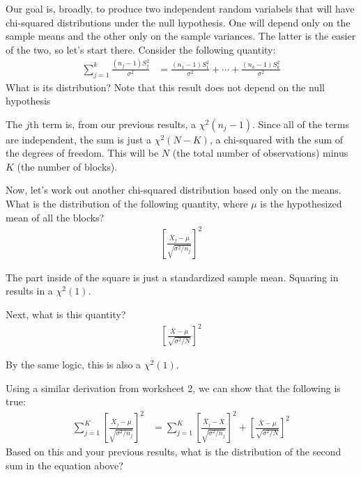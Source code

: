 
Our goal is, broadly, to produce two independent random variabels that will have
chi-squared distributions under the null hypothesis. One will depend only on
the sample means and the other only on the sample variances. The latter is the
easier of the two, so let's start there. Consider the following quantity:
\begin{align*}
\sum_{j=1}^k \frac{(n_j - 1) S_j^2}{\sigma^2} &= \frac{(n_1 - 1) S_1^2}{\sigma^2} + \cdots + \frac{(n_k - 1) S_k^2}{\sigma^2}
\end{align*}
What is its distribution? Note that this result does not depend on the null
hypothesis


The $j$th term is, from our previous results, a $\chi^2(n_j - 1)$. Since all
of the terms are independent, the sum is just a $\chi^2(N - K)$, a chi-squared
with the sum of the degrees of freedom. This will be $N$ (the total number of
observations) minus $K$ (the number of blocks).


Now, let's work out another chi-squared distribution based only on the means.
What is the distribution of the following quantity, where $\mu$ is the
hypothesized mean of all the blocks?
\begin{align*}
\left[\frac{\bar{X}_j - \mu}{\sqrt{\sigma^2 / n_j}}\right]^2
\end{align*} 


The part inside of the square is just a standardized sample mean. Squaring
in results in a $\chi^2(1)$.



Next, what is this quantity?
\begin{align*}
\left[\frac{\bar{X} - \mu}{\sqrt{\sigma^2 / N}}\right]^2
\end{align*} 


By the same logic, this is also a $\chi^2(1)$.


Using a similar derivation from worksheet 2, we can show that the following
is true:
\begin{align*}
\sum_{j=1}^K \left[\frac{\bar{X}_j - \mu}{\sqrt{\sigma^2 / n_j}}\right]^2 &=
\sum_{j=1}^K \left[\frac{\bar{X}_j - \bar{X}}{\sqrt{\sigma^2 / n_j}}\right]^2 +
\left[\frac{\bar{X} - \mu}{\sqrt{\sigma^2 / N}}\right]^2
\end{align*} 
Based on this and your previous results, what is the distribution of the 
second sum in the equation above?

